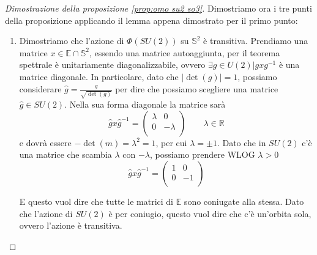 \documentclass[11pt]{article}
\theoremstyle{plain}
\theoremstyle{definition}
\theoremstyle{remark}
\newcommand{\R}{\mathbb{R}}
\begin{document}
\begin{proof}[Dimostrazione della proposizione \ref{prop:omo su2 so3}] Dimostriamo ora i tre punti della proposizione applicando il lemma appena dimostrato per il primo punto:
   \begin{enumerate}
   \item{
     Dimostriamo che l'azione di $\Phi(SU(2))$ su $\mathbb{S}^2$ è transitiva. Prendiamo una matrice $x \in \mathbb{E} \cap \mathbb{S}^2$, essendo una matrice autoaggiunta, per il teorema spettrale è unitariamente diagonalizzabile, ovvero $\exists g \in U(2) | gxg^{-1}$ è una matrice diagonale. In particolare, dato che $|\det(g)| = 1$, possiamo considerare $\displaystyle\hat g = \frac{g}{\sqrt{\det(g)}}$ per dire che possiamo scegliere una matrice $\hat g \in SU(2)$. Nella sua forma diagonale la matrice sarà
     \[ \hat g x \hat g^{-1} =
     \left(
     \begin{array}{cc}
       \lambda & 0 \\
       0 & -\lambda \\
     \end{array}
     \right)
     \qquad \lambda \in \R
     \]
     e dovrà essere $-\det(m) = \lambda^2 = 1$, per cui $\lambda = \pm 1$. Dato che in $SU(2)$ c'è una matrice che scambia $\lambda$ con $-\lambda$, possiamo prendere WLOG $\lambda > 0$
     \[ \hat g x \hat g^{-1} =
     \left(
     \begin{array}{cc}
       1 & 0 \\
       0 & -1 \\
     \end{array}
     \right)
     \]

     E questo vuol dire che tutte le matrici di $\mathbb{E}$ sono coniugate alla stessa. Dato che l'azione di $SU(2)$ è per coniugio, questo vuol dire che c'è un'orbita sola, ovvero l'azione è transitiva.

}
\end{enumerate}
\end{proof}
\end{document}
